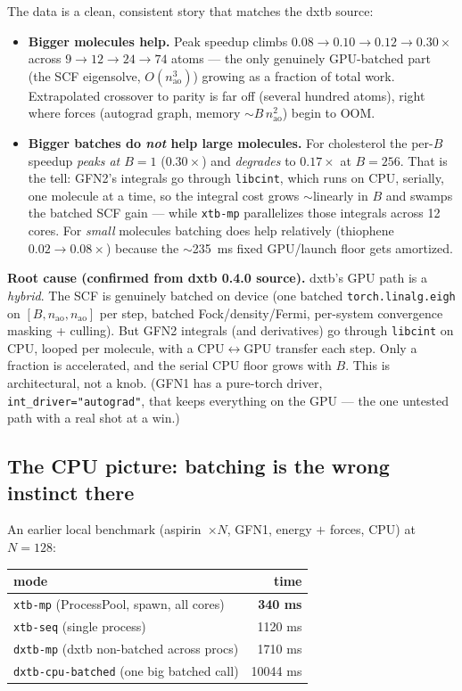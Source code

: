 \documentclass[11pt]{article}
\newcommand{\code}[1]{\texttt{#1}}
\begin{document}
The data is a clean, consistent story that matches the dxtb source:
\begin{itemize}
  \item \textbf{Bigger molecules help.} Peak speedup climbs $0.08\to0.10\to0.12
  \to0.30\times$ across $9\to12\to24\to74$ atoms --- the only genuinely
  GPU-batched part (the SCF eigensolve, $O(n_{\text{ao}}^3)$) growing as a
  fraction of total work. Extrapolated crossover to parity is far off (several
  hundred atoms), right where forces (autograd graph, memory $\sim B\,n_{\text{ao}}^2$)
  begin to OOM.
  \item \textbf{Bigger batches do \emph{not} help large molecules.} For
  cholesterol the per-$B$ speedup \emph{peaks at $B=1$} ($0.30\times$) and
  \emph{degrades} to $0.17\times$ at $B=256$. That is the tell: GFN2's integrals
  go through \code{libcint}, which runs on CPU, serially, one molecule at a time,
  so the integral cost grows $\sim$linearly in $B$ and swamps the batched SCF
  gain --- while \code{xtb-mp} parallelizes those integrals across 12 cores. For
  \emph{small} molecules batching does help relatively (thiophene $0.02\to0.08\times$)
  because the $\sim$235~ms fixed GPU/launch floor gets amortized.
\end{itemize}

\noindent\textbf{Root cause (confirmed from dxtb 0.4.0 source).} dxtb's GPU path
is a \emph{hybrid}. The SCF is genuinely batched on device (one batched
\code{torch.linalg.eigh} on $[B,n_{\text{ao}},n_{\text{ao}}]$ per step, batched
Fock/density/Fermi, per-system convergence masking + culling). But GFN2 integrals
(and derivatives) go through \code{libcint} on CPU, looped per molecule, with a
CPU$\leftrightarrow$GPU transfer each step. Only a fraction is accelerated, and
the serial CPU floor grows with $B$. This is architectural, not a knob. (GFN1 has
a pure-torch driver, \code{int\_driver="autograd"}, that keeps everything on the
GPU --- the one untested path with a real shot at a win.)

\subsection{The CPU picture: batching is the wrong instinct there}

An earlier local benchmark (aspirin~$\times N$, GFN1, energy $+$ forces, CPU) at
$N=128$:

\begin{center}
\begin{tabular}{lr}
\toprule
mode & time \\
\midrule
\code{xtb-mp} (ProcessPool, spawn, all cores) & \textbf{340 ms} \\
\code{xtb-seq} (single process)               & 1120 ms \\
\code{dxtb-mp} (dxtb non-batched across procs) & 1710 ms \\
\code{dxtb-cpu-batched} (one big batched call) & 10044 ms \\
\bottomrule
\end{tabular}
\end{center}
\end{document}
